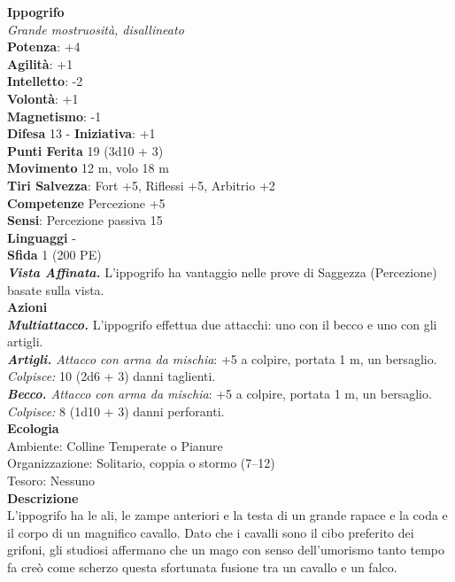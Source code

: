 \begin{multicols}{2}
\medskip\textbf{Ippogrifo}\\
\emph{Grande mostruosità, disallineato}\\
\textbf{Potenza}: +4\\
\textbf{Agilità}: +1\\
\textbf{Intelletto}: -2\\
\textbf{Volontà}: +1\\
\textbf{Magnetismo}: -1\\
\textbf{Difesa} 13 - \textbf{Iniziativa}: +1\\
\textbf{Punti Ferita} 19 (3d10 + 3)\\
\textbf{Movimento} 12 m, volo 18 m\\
\textbf{Tiri Salvezza}: Fort +5, Riflessi +5, Arbitrio +2\\
\textbf{Competenze} Percezione +5\\
\textbf{Sensi}: Percezione passiva 15\\
\textbf{Linguaggi} -\\
\textbf{Sfida} 1 (200 PE)\smallskip\\
\emph{\textbf{Vista Affinata.}} L'ippogrifo ha vantaggio nelle prove di Saggezza (Percezione) basate sulla vista.\\
\smallskip\textbf{Azioni}\\
\emph{\textbf{Multiattacco.}} L'ippogrifo effettua due attacchi: uno con il becco e uno con gli artigli.\\
\emph{\textbf{Artigli.} Attacco con arma da mischia}: +5 a colpire, portata 1 m, un bersaglio.\\
\emph{Colpisce:} 10 (2d6 + 3) danni taglienti.\\
\emph{\textbf{Becco.} Attacco con arma da mischia}: +5 a colpire, portata 1 m, un bersaglio.\\
\emph{Colpisce:} 8 (1d10 + 3) danni perforanti. \\
\textbf{Ecologia}\\
Ambiente: Colline Temperate o Pianure\\
Organizzazione: Solitario, coppia o stormo (7–12)\\
Tesoro: Nessuno\\
\textbf{Descrizione}\\
L’ippogrifo ha le ali, le zampe anteriori e la testa di un grande rapace e la coda e il corpo di un magnifico cavallo. Dato che i cavalli sono il cibo preferito dei grifoni, gli studiosi affermano che un mago con senso dell’umorismo tanto tempo fa creò come scherzo questa sfortunata fusione tra un cavallo e un falco.\\


\end{multicols}
